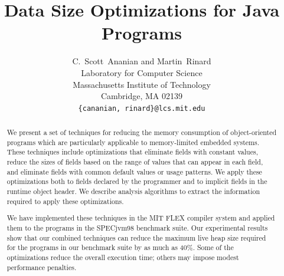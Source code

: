 \documentclass{acmconf}
\title{Data Size Optimizations for Java Programs}
\author{C.~Scott~Ananian and Martin~Rinard \\
Laboratory for Computer Science\\
Massachusetts Institute of Technology\\ 
Cambridge, MA 02139 \\
{\tt \{cananian, rinard\}@lcs.mit.edu}
}
\begin{document}

%
\maketitle
{}
%
\begin{abstract}
We present a set of techniques for reducing the memory consumption of
object-oriented programs which are particularly applicable to
memory-limited embedded systems. These techniques 
include optimizations that eliminate fields with
constant values, reduce the sizes of fields based on the range
of values that can appear in each field, and 
eliminate fields with common default values
or usage patterns.
We apply these optimizations both 
to fields declared by the programmer and to implicit fields in
the runtime object header. We describe analysis
algorithms to extract the information required to apply these
optimizations. 

We have implemented these techniques in the MIT FLEX compiler
system and applied them to the programs in the SPECjvm98 
benchmark suite. Our experimental results show that 
our combined techniques can reduce the maximum live heap size required
for the programs in our benchmark suite by as much as 40\%.
Some of the optimizations reduce the overall execution time;
others may impose modest performance penalties.
\end{abstract}
%
\end{document}
